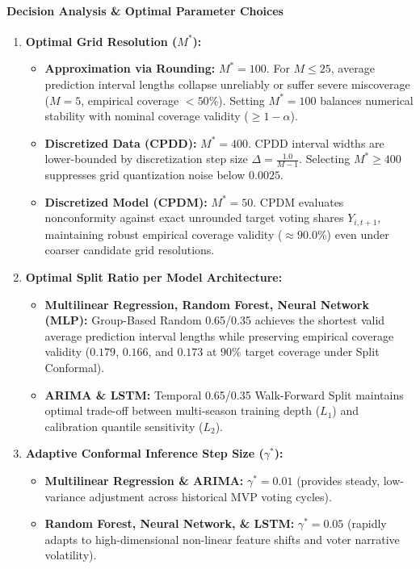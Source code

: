 \documentclass[11pt,a4paper]{article}
\begin{document}
\paragraph{Decision Analysis \& Optimal Parameter Choices}
\begin{enumerate}
    \item \textbf{Optimal Grid Resolution ($M^*$):}
    \begin{itemize}
        \item \textbf{Approximation via Rounding:} $M^* = 100$. For $M \le 25$, average prediction interval lengths collapse unreliably or suffer severe miscoverage ($M=5$, empirical coverage $< 50\%$). Setting $M^* = 100$ balances numerical stability with nominal coverage validity ($\ge 1-\alpha$).
        \item \textbf{Discretized Data (CPDD):} $M^* = 400$. CPDD interval widths are lower-bounded by discretization step size $\Delta = \frac{1.0}{M-1}$. Selecting $M^* \ge 400$ suppresses grid quantization noise below $0.0025$.
        \item \textbf{Discretized Model (CPDM):} $M^* = 50$. CPDM evaluates nonconformity against exact unrounded target voting shares $Y_{i, t+1}$, maintaining robust empirical coverage validity ($\approx 90.0\%$) even under coarser candidate grid resolutions.
    \end{itemize}
    \item \textbf{Optimal Split Ratio per Model Architecture:}
    \begin{itemize}
        \item \textbf{Multilinear Regression, Random Forest, Neural Network (MLP):} Group-Based Random 0.65/0.35 achieves the shortest valid average prediction interval lengths while preserving empirical coverage validity ($0.179$, $0.166$, and $0.173$ at $90\%$ target coverage under Split Conformal).
        \item \textbf{ARIMA \& LSTM:} Temporal 0.65/0.35 Walk-Forward Split maintains optimal trade-off between multi-season training depth ($L_1$) and calibration quantile sensitivity ($L_2$).
    \end{itemize}
    \item \textbf{Adaptive Conformal Inference Step Size ($\gamma^*$):}
    \begin{itemize}
        \item \textbf{Multilinear Regression \& ARIMA:} $\gamma^* = 0.01$ (provides steady, low-variance adjustment across historical MVP voting cycles).
        \item \textbf{Random Forest, Neural Network, \& LSTM:} $\gamma^* = 0.05$ (rapidly adapts to high-dimensional non-linear feature shifts and voter narrative volatility).
    \end{itemize}
\end{enumerate}
\end{document}
